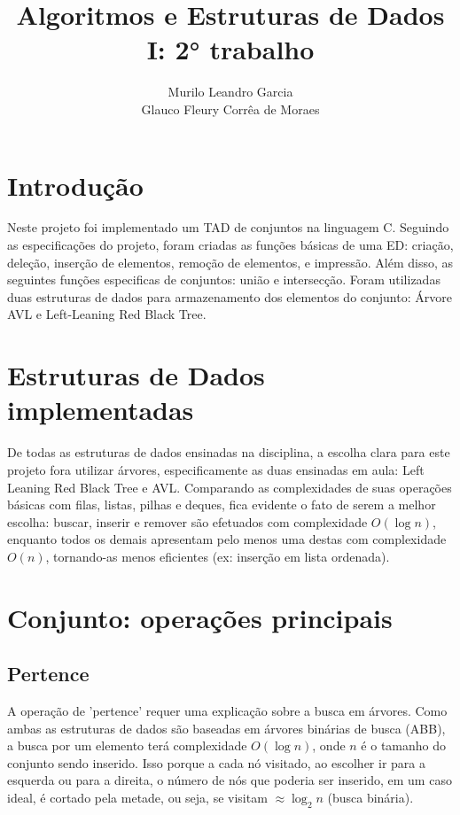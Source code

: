 \documentclass{article}
\title{Algoritmos e Estruturas de Dados I: 2° trabalho}
\author{
    Murilo Leandro Garcia \\ 
    Glauco Fleury Corrêa de Moraes
}
\date{}
\begin{document}
\maketitle

\section{Introdução}

Neste projeto foi implementado um TAD de conjuntos na linguagem C. Seguindo as especificações do projeto,
foram criadas as funções básicas de uma ED: criação, deleção, inserção de elementos, remoção de elementos, 
e impressão. Além disso, as seguintes funções especificas de conjuntos: união e intersecção. Foram utilizadas 
duas estruturas de dados para armazenamento dos elementos do conjunto: Árvore AVL e Left-Leaning Red Black Tree.

\section{Estruturas de Dados implementadas}

 De todas as estruturas de dados ensinadas na disciplina, a escolha clara para este projeto fora utilizar árvores,
especificamente as duas ensinadas em aula: Left Leaning Red Black Tree e AVL. Comparando as complexidades de suas
operações básicas com filas, listas, pilhas e deques, fica evidente o fato de serem a melhor escolha: buscar, inserir
e remover são efetuados com complexidade $O(\log n)$, enquanto todos os demais apresentam pelo menos uma destas com
complexidade $O(n)$, tornando-as menos eficientes (ex: inserção em lista ordenada).

\section{Conjunto: operações principais}
\subsection{Pertence}
A operação de 'pertence' requer uma explicação sobre a busca em árvores. Como ambas as estruturas de dados são baseadas
em árvores binárias de busca (ABB), a busca por um elemento terá complexidade $O(\log n)$, onde $n$ é o tamanho do conjunto 
sendo inserido. Isso porque a cada nó visitado, ao escolher ir para a esquerda ou para a direita, o número de nós que 
poderia ser inserido, em um caso ideal, é cortado pela metade, ou seja, se visitam $\approx \log_2 n$ (busca binária).
\end{document}
